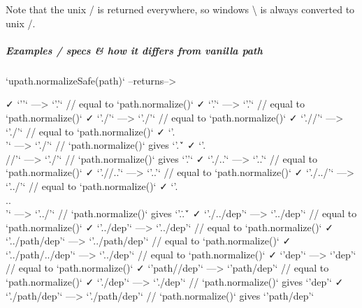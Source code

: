 Note that the unix {\ttfamily /} is returned everywhere, so windows {\ttfamily \textbackslash{}} is always converted to unix {\ttfamily /}.

\subparagraph*{Examples / specs \& how it differs from vanilla {\ttfamily path}}

\begin{DoxyVerb}`upath.normalizeSafe(path)`        --returns-->

    ✓ `''`                               --->                          `'.'`  // equal to `path.normalize()`
    ✓ `'.'`                              --->                          `'.'`  // equal to `path.normalize()`
    ✓ `'./'`                             --->                         `'./'`  // equal to `path.normalize()`
    ✓ `'.//'`                            --->                         `'./'`  // equal to `path.normalize()`
    ✓ `'.\\'`                            --->                         `'./'`  // `path.normalize()` gives `'.\'`
    ✓ `'.\\//'`                          --->                         `'./'`  // `path.normalize()` gives `'.\/'`
    ✓ `'./..'`                           --->                         `'..'`  // equal to `path.normalize()`
    ✓ `'.//..'`                          --->                         `'..'`  // equal to `path.normalize()`
    ✓ `'./../'`                          --->                        `'../'`  // equal to `path.normalize()`
    ✓ `'.\\..\\'`                        --->                        `'../'`  // `path.normalize()` gives `'.\..\'`
    ✓ `'./../dep'`                       --->                     `'../dep'`  // equal to `path.normalize()`
    ✓ `'../dep'`                         --->                     `'../dep'`  // equal to `path.normalize()`
    ✓ `'../path/dep'`                    --->                `'../path/dep'`  // equal to `path.normalize()`
    ✓ `'../path/../dep'`                 --->                     `'../dep'`  // equal to `path.normalize()`
    ✓ `'dep'`                            --->                        `'dep'`  // equal to `path.normalize()`
    ✓ `'path//dep'`                      --->                   `'path/dep'`  // equal to `path.normalize()`
    ✓ `'./dep'`                          --->                      `'./dep'`  // `path.normalize()` gives `'dep'`
    ✓ `'./path/dep'`                     --->                 `'./path/dep'`  // `path.normalize()` gives `'path/dep'`

\end{DoxyVerb}
